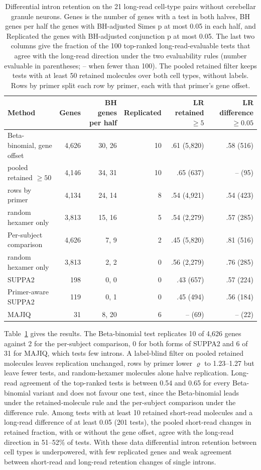 \documentclass[11pt]{article}
\begin{document}
\begin{table}[ht]
\centering
\footnotesize
\setlength{\tabcolsep}{4pt}
\begin{tabular}{lrrrrr}
\toprule
Method & Genes & BH genes per half & Replicated & LR retained $\ge5$ & LR difference $\ge0.05$\\
\midrule
Beta-binomial, gene offset & 4{,}626 & 30, 26 & 10 & .61 (5{,}820) & .58 (516)\\
\quad pooled retained $\ge50$ & 4{,}146 & 34, 31 & 10 & .65 (637) & -- (95)\\
\quad rows by primer & 4{,}134 & 24, 14 & 8 & .54 (4{,}921) & .54 (423)\\
\quad random hexamer only & 3{,}813 & 15, 16 & 5 & .54 (2{,}279) & .57 (285)\\
Per-subject comparison & 4{,}626 & 7, 9 & 2 & .45 (5{,}820) & .81 (516)\\
\quad random hexamer only & 3{,}813 & 2, 2 & 0 & .56 (2{,}279) & .76 (285)\\
SUPPA2 & 198 & 0, 0 & 0 & .43 (657) & .57 (224)\\
Primer-aware SUPPA2 & 119 & 0, 1 & 0 & .45 (494) & .56 (184)\\
MAJIQ & 31 & 8, 20 & 6 & -- (69) & -- (22)\\
\bottomrule
\end{tabular}
\caption{Differential intron retention on the 21 long-read cell-type pairs without cerebellar granule neurons. Genes is the number of genes with a test in both halves, BH genes per half the genes with BH-adjusted Simes p at most 0.05 in each half, and Replicated the genes with BH-adjusted conjunction p at most 0.05. The last two columns give the fraction of the 100 top-ranked long-read-evaluable tests that agree with the long-read direction under the two evaluability rules (number evaluable in parentheses; -- when fewer than 100). The pooled retained filter keeps tests with at least 50 retained molecules over both cell types, without labels. Rows by primer split each row by primer, each with that primer's gene offset.}
\label{tab:ir}
\end{table}

Table~\ref{tab:ir} gives the results. The Beta-binomial test replicates 10 of 4{,}626 genes against 2 for the per-subject comparison, 0 for both forms of SUPPA2 and 6 of 31 for MAJIQ, which tests few introns. A label-blind filter on pooled retained molecules leaves replication unchanged, rows by primer lower $\varrho$ to 1.23--1.27 but leave fewer tests, and random-hexamer molecules alone halve replication. Long-read agreement of the top-ranked tests is between 0.54 and 0.65 for every Beta-binomial variant and does not favour one test, since the Beta-binomial leads under the retained-molecule rule and the per-subject comparison under the difference rule. Among tests with at least 10 retained short-read molecules and a long-read difference of at least 0.05 (201 tests), the pooled short-read changes in retained fraction, with or without the gene offset, agree with the long-read direction in 51--52\% of tests. With these data differential intron retention between cell types is underpowered, with few replicated genes and weak agreement between short-read and long-read retention changes of single introns.
\end{document}
